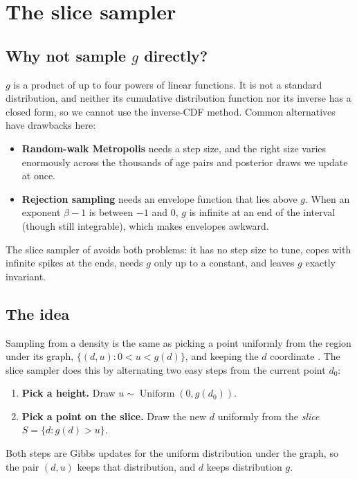 \documentclass[11pt,a4paper]{article}
\theoremstyle{definition}
\theoremstyle{remark}
\DeclareMathOperator{\Unif}{Uniform}
\begin{document}
\section{The slice sampler}
\label{sec:slice}

\subsection{Why not sample $g$ directly?}

$g$ is a product of up to four powers of linear functions. It is not a
standard distribution, and neither its cumulative distribution function nor
its inverse has a closed form, so we cannot use the inverse-CDF method.
Common alternatives have drawbacks here:
\begin{itemize}
  \item \textbf{Random-walk Metropolis} needs a step size, and the right size
        varies enormously across the thousands of age pairs and posterior
        draws we update at once.
  \item \textbf{Rejection sampling} needs an envelope function that lies above
        $g$. When an exponent $\beta-1$ is between $-1$ and $0$, $g$ is
        infinite at an end of the interval (though still integrable), which
        makes envelopes awkward.
\end{itemize}
The slice sampler of \citet{neal2003slice} avoids both problems: it has no
step size to tune, copes with infinite spikes at the ends, needs $g$ only up
to a constant, and leaves $g$ exactly invariant.

\subsection{The idea}

Sampling from a density is the same as picking a point uniformly from the
region under its graph, $\{(d,u): 0 < u < g(d)\}$, and keeping the $d$
coordinate \citep{neal2003slice,damien1999gibbs}. The slice sampler does this
by alternating two easy steps from the current point $d_0$:
\begin{enumerate}
  \item \textbf{Pick a height.} Draw $u \sim \Unif(0, g(d_0))$.
  \item \textbf{Pick a point on the slice.} Draw the new $d$ uniformly from
        the \emph{slice} $S = \{d : g(d) > u\}$.
\end{enumerate}
Both steps are Gibbs updates for the uniform distribution under the graph,
so the pair $(d,u)$ keeps that distribution, and $d$ keeps distribution $g$.
\end{document}

